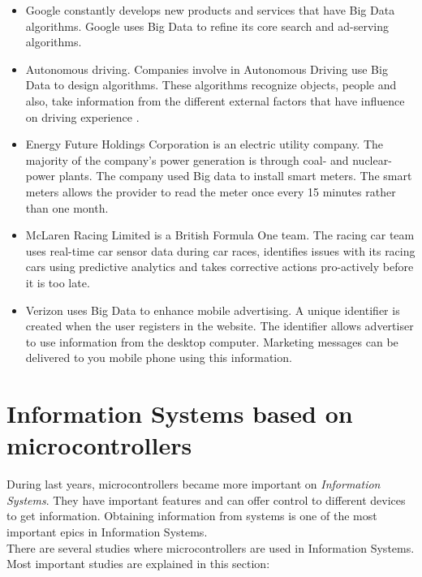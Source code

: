\begin{itemize}

\item Google constantly develops new products and services that have Big Data algorithms. Google uses Big Data to refine its core search and ad-serving algorithms.

\item Autonomous driving. Companies involve in Autonomous Driving use Big Data to design algorithms. These algorithms recognize objects, people and also, take information from the different external factors that have influence on driving experience \cite{bmw_driving}.

\item Energy Future Holdings Corporation is an electric utility company. The majority of the company's power generation is through coal- and nuclear-power plants. The company used Big data to install smart meters. The smart meters allows the provider to read the meter once every 15 minutes rather than one month.

\item McLaren Racing Limited is a British Formula One team. The racing car team uses real-time car sensor data during car races, identifies issues with its racing cars using predictive analytics and takes corrective actions pro-actively before it is too late.

\item Verizon uses Big Data to enhance mobile advertising. A unique identifier is created when the user registers in the website. The identifier allows advertiser to use information from the desktop computer. Marketing messages can be delivered to you mobile phone using this information.

\end{itemize}

\section{Information Systems based on microcontrollers}

During last years, microcontrollers became more important on \textit{Information Systems}. They have important features and can offer control to different devices to get information. Obtaining information from systems is one of the most important epics in Information Systems.\\

There are several studies where microcontrollers are used in Information Systems. Most important studies are explained in this section:

